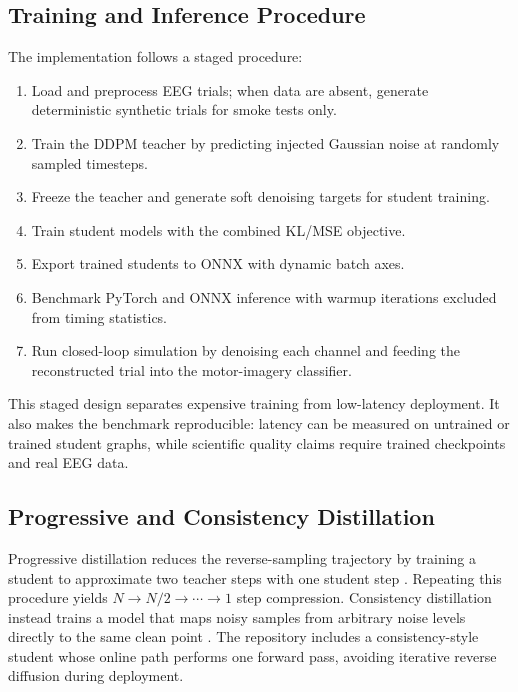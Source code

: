 \documentclass[11pt]{article}
\begin{document}
\subsection{Training and Inference Procedure}

The implementation follows a staged procedure:

\begin{enumerate}
    \item Load and preprocess EEG trials; when data are absent, generate deterministic synthetic trials for smoke tests only.
    \item Train the DDPM teacher by predicting injected Gaussian noise at randomly sampled timesteps.
    \item Freeze the teacher and generate soft denoising targets for student training.
    \item Train student models with the combined KL/MSE objective.
    \item Export trained students to ONNX with dynamic batch axes.
    \item Benchmark PyTorch and ONNX inference with warmup iterations excluded from timing statistics.
    \item Run closed-loop simulation by denoising each channel and feeding the reconstructed trial into the motor-imagery classifier.
\end{enumerate}

This staged design separates expensive training from low-latency deployment. It also makes the benchmark reproducible: latency can be measured on untrained or trained student graphs, while scientific quality claims require trained checkpoints and real EEG data.

\subsection{Progressive and Consistency Distillation}

Progressive distillation reduces the reverse-sampling trajectory by training a student to approximate two teacher steps with one student step \cite{salimans2022progressive}. Repeating this procedure yields \(N \rightarrow N/2 \rightarrow \cdots \rightarrow 1\) step compression. Consistency distillation instead trains a model that maps noisy samples from arbitrary noise levels directly to the same clean point \cite{song2023consistency}. The repository includes a consistency-style student whose online path performs one forward pass, avoiding iterative reverse diffusion during deployment.
\end{document}
